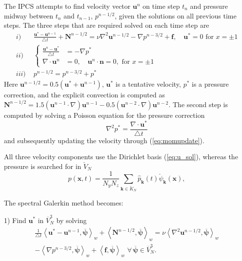 \documentclass[11pt, oneside]{article}
\newcommand{\N}[1]{\check{#1}}
\newcommand{\D}[1]{\overline{#1}}
\begin{document}
The IPCS attempts to find velocity vector $\bm{u}^{n}$ on time step $t_n$  and pressure midway between $t_n$ and $t_{n-1}$, $p^{n-1/2}$, given the solutions on all previous time steps. The three steps that are required solved on each time step are
\begin{align}
i)&\,\, \frac{\bm{u}^{*}-\bm{u}^{n-1}}{\triangle t} + \bm{N}^{n-1/2}   = \nu \nabla^2 \bm{u}^{n-1/2} - \nabla{p}^{n-3/2} + \bm{f}, \quad \bm{u}^*=0 \text{ for } x=\pm1   \label{eq:NSCN} \\
ii)&\,\,\begin{cases}
  \frac{\bm{u}^{n}-\bm{u}^*}{\triangle t} &= -\nabla p^* \\
  \nabla \cdot \bm{u}^{n} &= 0, \quad \bm{u}^n\cdot \bm{n} = 0,\text{ for } x=\pm1
  \end{cases} \label{eq:momupdate}\\
  iii)&\,\,p^{n-1/2}=p^{n-3/2}+p^* \label{eq:pupdate} 
\end{align}
Here $\bm{u}^{n-1/2} = 0.5(\bm{u}^*+\bm{u}^{n-1})$, $\bm{u}^*$ is a tentative velocity, $p^*$ is a pressure correction, and the explicit convection is computed as $\bm{N}^{n-1/2}=1.5(\bm{u}^{n-1}\cdot \nabla) \bm{u}^{n-1} - 0.5(\bm{u}^{n-2}\cdot \nabla) \bm{u}^{n-2}$. The second step is computed by solving a Poisson equation for the pressure correction
\begin{equation}
  \nabla^2p^* = \frac{\nabla \cdot \bm{u}^*}{\triangle t}
\end{equation}
and subsequently updating the velocity through (\ref{eq:momupdate}).

All three velocity components use the Dirichlet basis (\ref{eq:u_sol}), whereas the pressure is searched for in $\N{V}_N$
\begin{equation}
p(\bm{x}, t) = \frac{1}{N_yN_z}\sum_{\bm{k} \in \N{K}_N} \hat{p}_{\bm{k}}(t) \N{\psi}_{\bm{k}}(\bm{x}), \label{eq:p_sol}
\end{equation}
 
The spectral Galerkin method becomes: 

1) Find $\bm{u}^*$ in $\D{V}_N^3$ by solving
\begin{multline}
 \frac{1}{\triangle t}\left<\bm{u}^*-\bm{u}^{n-1}, \bm{\D{\psi}}\right>_w + \left<\bm{N}^{n-1/2}, \bm{\D{\psi}} \right>_w   = \nu \left<\nabla^2 \bm{u}^{n-1/2}, \bm{\D{\psi}} \right>_w \\ - \left<\nabla{p}^{n-3/2}, \bm{\D{\psi}} \right>_w + \left<\bm{f}, \bm{\D{\psi}} \right>_w \,\,  \forall \, \bm{\D{\psi}} \in \D{V}_N^3. \label{eq:tentative}
\end{multline}
\end{document}
